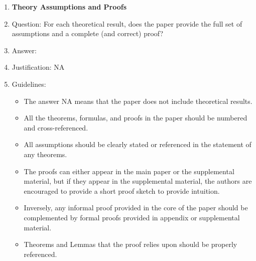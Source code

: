 \documentclass{article}
\begin{document}
\begin{enumerate}
\item {\bf Theory Assumptions and Proofs}
    \item[] Question: For each theoretical result, does the paper provide the full set of assumptions and a complete (and correct) proof?
    \item[] Answer: \answerNA{} %
    \item[] Justification: NA
    \item[] Guidelines:
    \begin{itemize}
        \item The answer NA means that the paper does not include theoretical results. 
        \item All the theorems, formulas, and proofs in the paper should be numbered and cross-referenced.
        \item All assumptions should be clearly stated or referenced in the statement of any theorems.
        \item The proofs can either appear in the main paper or the supplemental material, but if they appear in the supplemental material, the authors are encouraged to provide a short proof sketch to provide intuition. 
        \item Inversely, any informal proof provided in the core of the paper should be complemented by formal proofs provided in appendix or supplemental material.
        \item Theorems and Lemmas that the proof relies upon should be properly referenced. 
    \end{itemize}


\end{enumerate}
\end{document}
